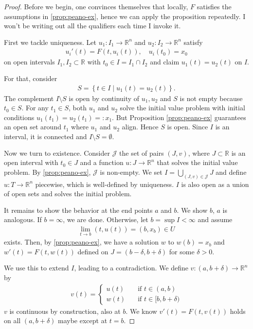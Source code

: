 \begin{proof}
	Before we begin, one convinces themselves that locally, $F$ satisfies the assumptions in \ref{prop:peano-ex}, hence we can apply the proposition repeatedly. I won't be writing out all the qualifiers each time I invoke it.

    First we tackle uniqueness. Let $u_{1}: I_{1} \to \mathbb{R}^{n}$ and $u_{2}: I_{2} \to \mathbb{R}^{n}$ satisfy
    \begin{align*}
        u_{i}'(t) =F(t, u_{i}(t)), \quad u_{i}(t_{0}) = x_{0}
    \end{align*}
    on open intervals $I_{1}, I_{2} \subset \mathbb{R}$ with $t_{0} \in I = I_{1} \cap I_{2}$ and claim $u_{1}(t) = u_{2}(t)$ on $I$. 

    For that, consider
    \begin{align*}
        S = \left\{ t \in I \mid u_{1}(t) = u_{2}(t) \right\}.
    \end{align*}
    The complement $I \setminus S$ is open by continuity of $u_{1}, u_{2}$ and $S$ is not empty because $t_{0} \in S$. For any $t_{1} \in S$, both $u_{1}$ and $u_{2}$ solve the initial value problem with initial conditions $u_{1}(t_{1}) = u_{2}(t_{1}) =: x_{1}$. But Proposition \ref{prop:peano-ex} guarantees an open set around $t_{1}$ where $u_{1}$ and $u_{2}$ align. Hence $S$ is open. Since $I$ is an interval, it is connected and $I \setminus S = \emptyset$.

    Now we turn to existence. Consider $\mathcal{J}$ the set of pairs $(J, v)$, where $J \subset \mathbb{R}$ is an open interval with $t_{0} \in J$ and a function $u: J \to \mathbb{R}^{n}$ that solves the initial value problem. By \ref{prop:peano-ex}, $\mathcal{J}$ is non-empty. We set $I = \bigcup_{(J,v) \in \mathcal{J}} J$ and define $u: T \to \mathbb{R}^{n}$ piecewise, which is well-defined by uniqueness. $I$ is also open as a union of open sets and solves the initial problem.

    It remains to show the behavior at the end points $a$ and $b$. We show $b$, $a$ is analogous. If $b = \infty$, we are done. Otherwise, let $b = \sup I < \infty$ and assume 
    \begin{align*}
        \lim_{t \to b}(t,u(t)) = (b,x_{b}) \in U
    \end{align*}
    exists. Then, by \ref{prop:peano-ex}, we have a solution $w$ to $w(b) = x_{b}$ and $w'(t) = F(t,w(t))$ defined on $J = (b - \delta, b + \delta)$ for some $\delta > 0$. 

    We use this to extend $I$, leading to a contradiction. We define $v: (a,b+\delta) \to \mathbb{R}^{n}$ by
    \begin{align*}
        v(t) = \begin{cases}
            u(t) \quad &\text{if } t \in (a,b) \\ 
            w(t) \quad &\text{if }t \in [b, b+\delta)
        \end{cases}
    \end{align*}
    $v$ is continuous by construction, also at $b$. We know $v'(t) = F(t,v(t))$ holds on all $(a, b+\delta)$ maybe except at $t=b$. 


\end{proof}
